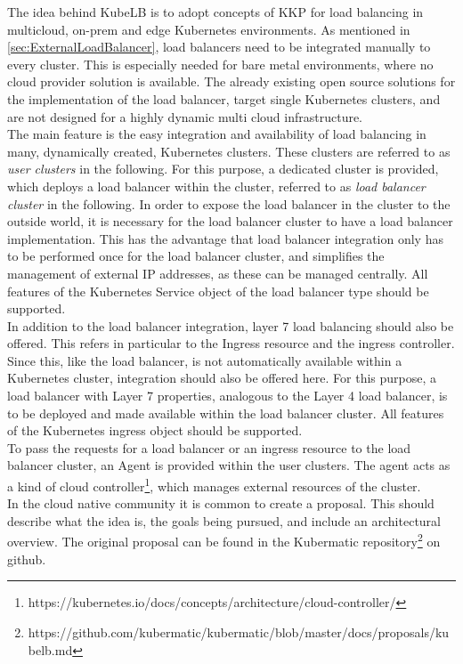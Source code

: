 The idea behind KubeLB is to adopt concepts of KKP for load balancing in multicloud, on-prem and edge Kubernetes environments.
As mentioned in \autoref{sec:ExternalLoadBalancer}, load balancers need to be integrated manually to every cluster.
This is especially needed for bare metal environments, where no cloud provider solution is available.
The already existing open source solutions for the implementation of the load balancer, target single Kubernetes clusters, and are not designed for a highly dynamic multi cloud infrastructure.
\\
The main feature is the easy integration and availability of load balancing in many, dynamically created, Kubernetes clusters.
These clusters are referred to as \textit{user clusters} in the following.
For this purpose, a dedicated cluster is provided, which deploys a load balancer within the cluster, referred to as \textit{load balancer cluster} in the following.
In order to expose the load balancer in the cluster to the outside world, it is necessary for the load balancer cluster to have a load balancer implementation.
This has the advantage that load balancer integration only has to be performed once for the load balancer cluster, and simplifies the management of external IP addresses, as these can be managed centrally.
All features of the Kubernetes Service object of the load balancer type should be supported.
\\
In addition to the load balancer integration, layer 7 load balancing should also be offered.
This refers in particular to the Ingress resource and the ingress controller.
Since this, like the load balancer, is not automatically available within a Kubernetes cluster, integration should also be offered here.
For this purpose, a load balancer with Layer 7 properties, analogous to the Layer 4 load balancer, is to be deployed and made available within the load balancer cluster.
All features of the Kubernetes ingress object should be supported.
\\
To pass the requests for a load balancer or an ingress resource to the load balancer cluster, an Agent is provided within the user clusters.
The agent acts as a kind of cloud controller\footnote{https://kubernetes.io/docs/concepts/architecture/cloud-controller/}, which manages external resources of the cluster.
\\
In the cloud native community it is common to create a proposal.
This should describe what the idea is, the goals being pursued, and include an architectural overview.
The original proposal can be found in the Kubermatic repository\footnote{https://github.com/kubermatic/kubermatic/blob/master/docs/proposals/kubelb.md} on github.
